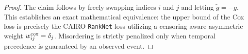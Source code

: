 \documentclass[11pt]{article}
\theoremstyle{plain}
\theoremstyle{plain}
\theoremstyle{plain}
\theoremstyle{plain}
\theoremstyle{plain}
\theoremstyle{plain}
\theoremstyle{plain}
\begin{document}
\begin{proof}

The claim follows by freely swapping indices $i$ and $j$ and letting $\tilde{g}= -g$.
This establishes an exact mathematical equivalence: the upper bound of the Cox loss is precisely the \textsc{CAIRO} \texttt{RankNet} loss utilizing a censoring-aware asymmetric weight $w^{\textup{cox}}_{ij} = \delta_j$. Misordering is strictly penalized only when temporal precedence is guaranteed by an observed event.
\end{proof}

\end{document}
